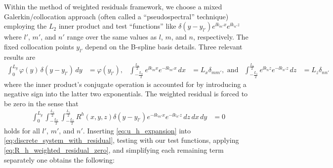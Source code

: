 Within the method of weighted residuals framework, we choose a mixed
Galerkin/collocation approach (often called a ``pseudospectral'' technique)
employing the $L_{2}$ inner product and test ``functions'' like
$\delta(y-y_{l'}) e^{\ii k_{m'} x}e^{\ii k_{n'} z}$ where $l'$, $m'$, and $n'$
range over the same values as $l$, $m$, and $n$, respectively.  The fixed
collocation points $y_{l'}$ depend on the B-spline basis details.  Three
relevant results are
\begin{align}
   \int_0^{L_y} \varphi(y) \, \delta(y-y_{l'}) \,d\!y
&= \varphi(y_{l'}),
&
   \int_{-\frac{L_x}{2}}^{\frac{L_x}{2}} e^{\ii k_m x} e^{-\ii k_{m'} x} \,d\!x
&= L_x \delta_{m m'}, \text{ and}
&
   \int_{-\frac{L_z}{2}}^{\frac{L_z}{2}} e^{\ii k_n z} e^{-\ii k_{n'} z} \,d\!z
&= L_z \delta_{n n'}
\end{align}
where the inner product's conjugate operation is accounted for by introducing a
negative sign into the latter two exponentials.  The weighted residual is
forced to be zero in the sense that
\begin{align}
  \int_0^{L_y}
  \int_{-\frac{L_x}{2}}^{\frac{L_x}{2}}
  \int_{-\frac{L_z}{2}}^{\frac{L_z}{2}}
  R^h\!\left(x,y,z\right) \delta(y-y_{l'}) e^{-\ii k_{m'} x}e^{-\ii k_{n'} z}
  \,d\!z \,d\!x \,d\!y
  &=
  0
  \label{eq:R_h_weighted_residual_zero}
\end{align}
holds for all $l'$, $m'$, and $n'$.  Inserting \eqref{eq:u_h_expansion} into
\eqref{eq:discrete_system_with_residual}, testing with our test functions,
applying \eqref{eq:R_h_weighted_residual_zero}, and simplifying each remaining
term separately one obtains the following:
